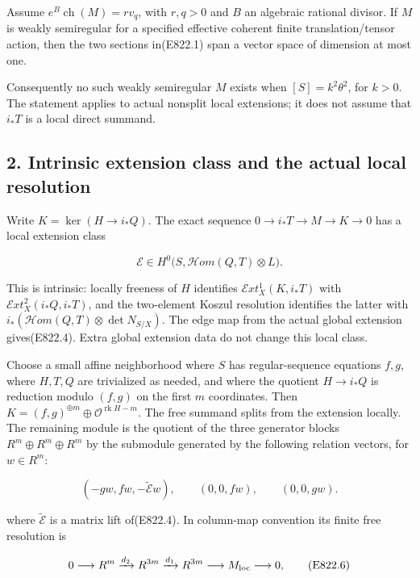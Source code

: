 Assume \(e^B\operatorname{ch}(M)=r v_q\), with \(r,q>0\) and \(B\) an
algebraic rational divisor. If \(M\) is weakly semiregular for a
specified effective coherent finite translation/tensor action, then the
two sections in(E822.1) span a vector space of dimension at most one.

Consequently no such weakly semiregular \(M\) exists when
\([S]=k^2\theta^2\), for \(k>0\). The statement applies to actual
nonsplit local extensions; it does not assume that \(i_*T\) is a local
direct summand.

\subsection{2. Intrinsic extension class and the actual local
resolution}\label{SF-E822-intrinsic-extension-class-and-the-actual-local-resolution}

Write \(K=\ker(H\to i_*Q)\). The exact sequence
\(0\to i_*T\to M\to K\to0\) has a local extension class

\[
 \mathcal E\in H^0\bigl(S,\mathcal H om(Q,T)\otimes L\bigr).
 \tag{E822.4}
\]

This is intrinsic: locally freeness of \(H\) identifies
\(\mathcal E xt^1_X(K,i_*T)\) with \(\mathcal E xt^2_X(i_*Q,i_*T)\), and
the two-element Koszul resolution identifies the latter with
\(i_*(\mathcal H om(Q,T)\otimes\det N_{S/X})\). The edge map from the
actual global extension gives(E822.4). Extra global extension data do
not change this local class.

Choose a small affine neighborhood where \(S\) has regular-sequence
equations \(f,g\), where \(H,T,Q\) are trivialized as needed, and where
the quotient \(H\to i_*Q\) is reduction modulo \((f,g)\) on the first
\(m\) coordinates. Then
\(K=(f,g)^{\oplus m}\oplus\mathcal O^{\operatorname{rk}H-m}\). The free
summand splits from the extension locally. The remaining module is the
quotient of the three generator blocks \(R^m\oplus R^m\oplus R^m\) by
the submodule generated by the following relation vectors, for
\(w\in R^m\):

\[
 (-gw,fw,-\widetilde{\mathcal E}w),
 \qquad (0,0,fw),\qquad (0,0,gw).
 \tag{E822.5}
\]

where \(\widetilde{\mathcal E}\) is a matrix lift of(E822.4). In
column-map convention its finite free resolution is

\[
 0\longrightarrow R^m\xrightarrow{d_2}R^{3m}
       \xrightarrow{d_1}R^{3m}\longrightarrow M_{\rm loc}
       \longrightarrow0,
 \tag{E822.6}
\]

